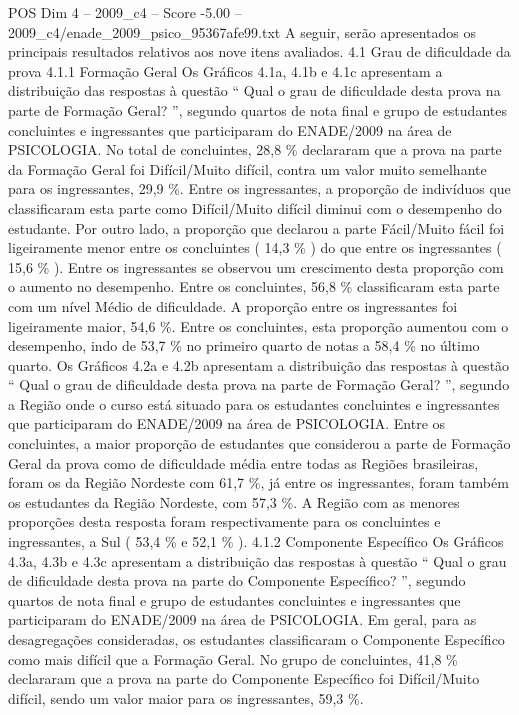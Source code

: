 \begin{textsample}{POS Dim 4 – 2009\_c4 – Score -5.00 – 2009\_c4/enade\_2009\_psico\_95367afe99.txt}
A seguir, serão apresentados os principais resultados relativos aos nove itens avaliados. 4.1 Grau de dificuldade da prova 4.1.1 Formação Geral Os Gráficos 4.1a, 4.1b e 4.1c apresentam a distribuição das respostas à questão “ Qual o grau de dificuldade desta prova na parte de Formação Geral? ”, segundo quartos de nota final e grupo de estudantes concluintes e ingressantes que participaram do ENADE/2009 na área de PSICOLOGIA.
No total de concluintes, 28,8 \% declararam que a prova na parte da Formação Geral foi Difícil/Muito difícil, contra um valor muito semelhante para os ingressantes, 29,9 \%.
Entre os ingressantes, a proporção de indivíduos que classificaram esta parte como Difícil/Muito difícil diminui com o desempenho do estudante.
Por outro lado, a proporção que declarou a parte Fácil/Muito fácil foi ligeiramente menor entre os concluintes ( 14,3 \% ) do que entre os ingressantes ( 15,6 \% ).
Entre os ingressantes se observou um crescimento desta proporção com o aumento no desempenho.
Entre os concluintes, 56,8 \% classificaram esta parte com um nível Médio de dificuldade.
A proporção entre os ingressantes foi ligeiramente maior, 54,6 \%.
Entre os concluintes, esta proporção aumentou com o desempenho, indo de 53,7 \% no primeiro quarto de notas a 58,4 \% no último quarto.
Os Gráficos 4.2a e 4.2b apresentam a distribuição das respostas à questão “ Qual o grau de dificuldade desta prova na parte de Formação Geral? ”, segundo a Região onde o curso está situado para os estudantes concluintes e ingressantes que participaram do ENADE/2009 na área de PSICOLOGIA.
Entre os concluintes, a maior proporção de estudantes que considerou a parte de Formação Geral da prova como de dificuldade média entre todas as Regiões brasileiras, foram os da Região Nordeste com 61,7 \%, já entre os ingressantes, foram também os estudantes da Região Nordeste, com 57,3 \%.
A Região com as menores proporções desta resposta foram respectivamente para os concluintes e ingressantes, a Sul ( 53,4 \% e 52,1 \% ). 4.1.2 Componente Específico Os Gráficos 4.3a, 4.3b e 4.3c apresentam a distribuição das respostas à questão “ Qual o grau de dificuldade desta prova na parte do Componente Específico? ”, segundo quartos de nota final e grupo de estudantes concluintes e ingressantes que participaram do ENADE/2009 na área de PSICOLOGIA.
Em geral, para as desagregações consideradas, os estudantes classificaram o Componente Específico como mais difícil que a Formação Geral.
No grupo de concluintes, 41,8 \% declararam que a prova na parte do Componente Específico foi Difícil/Muito difícil, sendo um valor maior para os ingressantes, 59,3 \%.

\end{textsample}
